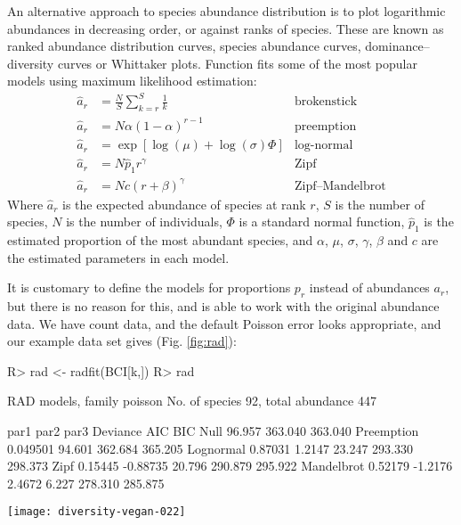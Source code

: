 \documentclass[article,nojss]{jss}
\begin{document}
An alternative approach to species abundance distribution is to plot
logarithmic abundances in decreasing order, or against ranks of
species.  These are known as ranked abundance
distribution curves, species abundance curves, dominance--diversity
curves or Whittaker plots.
Function  fits some of the most popular models using
maximum likelihood estimation:
\begin{align}
\hat a_r &= \frac{N}{S} \sum_{k=r}^S \frac{1}{k} &\text{brokenstick}\\
\hat a_r &= N \alpha (1-\alpha)^{r-1} & \text{preemption} \\
\hat a_r &= \exp \left[\log (\mu) + \log (\sigma) \Phi \right]
&\text{log-normal}\\
\hat a_r &= N \hat p_1 r^\gamma &\text{Zipf}\\
\hat a_r &= N c (r + \beta)^\gamma &\text{Zipf--Mandelbrot}
\end{align}
Where $\hat a_r$ is the expected abundance of species at rank $r$, $S$
is the number of species, $N$ is the number of individuals, $\Phi$ is
a standard normal function, $\hat p_1$ is the estimated proportion of
the most abundant species, and $\alpha$, $\mu$, $\sigma$, $\gamma$,
$\beta$ and $c$ are the estimated parameters in each model.

It is customary to define the models for proportions $p_r$ instead of
abundances $a_r$, but there is no reason for this, and 
is able to work with the original abundance data.  We have count data,
and the default Poisson error looks appropriate, and our example data
set gives (Fig. \ref{fig:rad}):
\begin{Schunk}
\begin{Sinput}
R> rad <- radfit(BCI[k,])
R> rad
\end{Sinput}
\begin{Soutput}
RAD models, family poisson 
No. of species 92, total abundance 447

           par1      par2     par3    Deviance AIC     BIC    
Null                                   96.957  363.040 363.040
Preemption  0.049501                   94.601  362.684 365.205
Lognormal   0.87031   1.2147           23.247  293.330 298.373
Zipf        0.15445  -0.88735          20.796  290.879 295.922
Mandelbrot  0.52179  -1.2176   2.4672   6.227  278.310 285.875
\end{Soutput}
\end{Schunk}
\begin{SCfigure}
\texttt{[image: diversity-vegan-022]}
\caption{Ranked abundance distribution models for a random plot
  (no. 34).  The best model has the lowest \textsc{aic}.}
\label{fig:rad}
\end{SCfigure}
\end{document}
